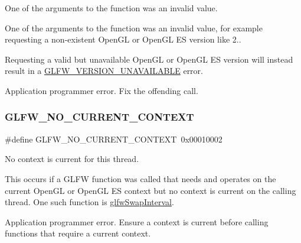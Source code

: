 One of the arguments to the function was an invalid value. 

One of the arguments to the function was an invalid value, for example requesting a non-\/existent Open\+GL or Open\+GL ES version like 2..

Requesting a valid but unavailable Open\+GL or Open\+GL ES version will instead result in a \hyperlink{group__errors_gad16c5565b4a69f9c2a9ac2c0dbc89462}{G\+L\+F\+W\+\_\+\+V\+E\+R\+S\+I\+O\+N\+\_\+\+U\+N\+A\+V\+A\+I\+L\+A\+B\+LE} error.

Application programmer error. Fix the offending call. \mbox{\label{group__errors_gaa8290386e9528ccb9e42a3a4e16fc0d0}} 
\subsubsection{\texorpdfstring{G\+L\+F\+W\+\_\+\+N\+O\+\_\+\+C\+U\+R\+R\+E\+N\+T\+\_\+\+C\+O\+N\+T\+E\+XT}{GLFW\_NO\_CURRENT\_CONTEXT}}
{\footnotesize\ttfamily \#define G\+L\+F\+W\+\_\+\+N\+O\+\_\+\+C\+U\+R\+R\+E\+N\+T\+\_\+\+C\+O\+N\+T\+E\+XT~0x00010002}



No context is current for this thread. 

This occurs if a G\+L\+FW function was called that needs and operates on the current Open\+GL or Open\+GL ES context but no context is current on the calling thread. One such function is \hyperlink{group__context_ga12a595c06947cec4967c6e1f14210a8a}{glfw\+Swap\+Interval}.

Application programmer error. Ensure a context is current before calling functions that require a current context. \mbox{\label{group__errors_gacff24d2757da752ae4c80bf452356487}} 
